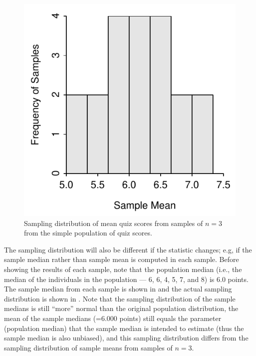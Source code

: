 \documentclass[10pt,openany]{book}\usepackage[]{graphicx}\usepackage[]{color}
\newenvironment{knitrout}{}{} %
\begin{document}
\begin{knitrout}
\color{fgcolor}\begin{figure}[hbtp]

{\centering \includegraphics[width=.4\linewidth]{Figs/SDistQuiz3-1} 

}

\caption[Sampling distribution of mean quiz scores from samples of $n=3$ from the simple population of quiz scores]{Sampling distribution of mean quiz scores from samples of $n=3$ from the simple population of quiz scores.}\label{fig:SDistQuiz3}
\end{figure}


\end{knitrout}




The sampling distribution will also be different if the statistic changes; e.g, if the sample median rather than sample mean is computed in each sample.  Before showing the results of each sample, note that the population median (i.e., the median of the individuals in the population --- 6, 6, 4, 5, 7, and 8) is 6.0 points.  The sample median from each sample is shown in  and the actual sampling distribution is shown in .  Note that the sampling distribution of the sample medians is still ``more'' normal than the original population distribution, the mean of the sample medians (=6.000 points) still equals the parameter (population median) that the sample median is intended to estimate (thus the sample median is also unbiased), and this sampling distribution differs from the sampling distribution of sample means from samples of $n=3$.
\end{document}
